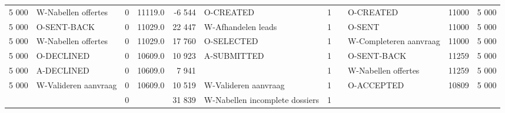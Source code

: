 \begin{tabular}{rlrlrlrllll}
5 000 & W-Nabellen offertes & 0 & 11119.0 & -6 544 & O-CREATED & 1 &  & O-CREATED & 11000 & 5 000 \\
5 000 & O-SENT-BACK & 0 & 11029.0 & 22 447 & W-Afhandelen leads & 1 &  & O-SENT & 11000 & 5 000 \\
5 000 & W-Nabellen offertes & 0 & 11029.0 & 17 760 & O-SELECTED & 1 &  & W-Completeren aanvraag & 11000 & 5 000 \\
5 000 & O-DECLINED & 0 & 10609.0 & 10 923 & A-SUBMITTED & 1 &  & O-SENT-BACK & 11259 & 5 000 \\
5 000 & A-DECLINED & 0 & 10609.0 & 7 941 &  & 1 &  & W-Nabellen offertes & 11259 & 5 000 \\
5 000 & W-Valideren aanvraag & 0 & 10609.0 & 10 519 & W-Valideren aanvraag & 1 &  & O-ACCEPTED & 10809 & 5 000 \\
 &  & 0 &  & 31 839 & W-Nabellen incomplete dossiers & 1 &  &  &  &  \\
\bottomrule
\end{tabular}
